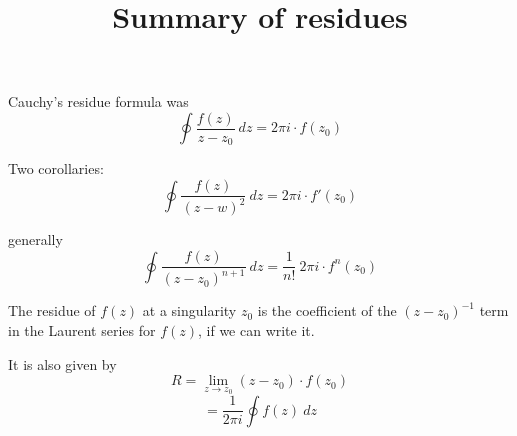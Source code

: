 \documentclass[11pt, oneside]{article}
\title{Summary of residues}
\date{}
\begin{document}
\maketitle
\Large


Cauchy's residue formula was
\[ \oint \frac{f(z)}{z - z_0} \ dz = 2 \pi i \cdot f(z_0) \]

Two corollaries:
\[ \oint \frac{f(z)}{(z - w)^2} \ dz = 2 \pi i \cdot f'(z_0) \]

generally
\[ \oint \frac{f(z)}{(z - z_0)^{n+1}} \ dz = \frac{1}{n!} \ 2 \pi i \cdot f^{n}(z_0) \]

The residue of $f(z)$ at a singularity $z_0$ is the coefficient of the $(z - z_0)^{-1}$ term in the Laurent series for $f(z)$, if we can write it.

It is also given by
\[ R = \lim_{z \rightarrow z_0} (z - z_0) \cdot f(z_0) \]
\[ = \frac{1}{2 \pi i} \oint f(z) \ dz \]
\end{document}
